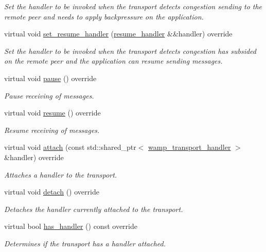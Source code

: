 \begin{DoxyCompactItemize}
\begin{DoxyCompactList}\small\item\em Set the handler to be invoked when the transport detects congestion sending to the remote peer and needs to apply backpressure on the application. \end{DoxyCompactList}\item 
virtual void \hyperlink{classautobahn_1_1wamp__websocket__transport_a0d8ded9c1d996bb5ef5b0a0247ad55cf}{set\+\_\+resume\+\_\+handler} (\hyperlink{classautobahn_1_1wamp__transport_ad36057ec27420793db7d8d658f3f003c}{resume\+\_\+handler} \&\&handler) override
\begin{DoxyCompactList}\small\item\em Set the handler to be invoked when the transport detects congestion has subsided on the remote peer and the application can resume sending messages. \end{DoxyCompactList}\item 
virtual void \hyperlink{classautobahn_1_1wamp__websocket__transport_a093019f8a063a95a61c35a929f3f5724}{pause} () override
\begin{DoxyCompactList}\small\item\em Pause receiving of messages. \end{DoxyCompactList}\item 
virtual void \hyperlink{classautobahn_1_1wamp__websocket__transport_a3074c50b8b8a4b30ed919ffb34db4a98}{resume} () override
\begin{DoxyCompactList}\small\item\em Resume receiving of messages. \end{DoxyCompactList}\item 
virtual void \hyperlink{classautobahn_1_1wamp__websocket__transport_a50e5ef694980acdf33df523f7d764e52}{attach} (const std\+::shared\+\_\+ptr$<$ \hyperlink{classautobahn_1_1wamp__transport__handler}{wamp\+\_\+transport\+\_\+handler} $>$ \&handler) override
\begin{DoxyCompactList}\small\item\em Attaches a handler to the transport. \end{DoxyCompactList}\item 
virtual void \hyperlink{classautobahn_1_1wamp__websocket__transport_a99dfe543cd8d71e50433c9c655ddedbd}{detach} () override
\begin{DoxyCompactList}\small\item\em Detaches the handler currently attached to the transport. \end{DoxyCompactList}\item 
virtual bool \hyperlink{classautobahn_1_1wamp__websocket__transport_a8238168035d76da4aaace2ae438cb79f}{has\+\_\+handler} () const override
\begin{DoxyCompactList}\small\item\em Determines if the transport has a handler attached. \end{DoxyCompactList}\end{DoxyCompactItemize}
